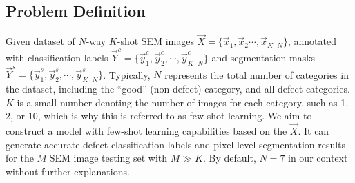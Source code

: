 
\subsection{Problem Definition}
\begin{myproblem} 

Given dataset of $N$-way $K$-shot SEM images $\vec{X} = \{\vec{x}_1, \vec{x}_2 \cdots, \vec{x}_{K \cdot N}\}$, annotated with classification labels $ \vec{Y}^c = \{\vec{y}_1^c, \vec{y}_2^c, \cdots, \vec{y}_{K \cdot N}^c\}$ and segmentation masks $\vec{Y} ^s = \{\vec{y}_1^s, \vec{y}_2^s, \cdots, \vec{y}_{K \cdot N}^s\}$. Typically, $N$ represents the total number of categories in the dataset, including the ``good'' (non-defect) category, and all defect categories. $K$ is a small number denoting the number of images for each category, such as 1, 2, or 10, which is why this is referred to as few-shot learning. 
We aim to construct a model with few-shot learning capabilities based on the $\vec{X}$. It can generate accurate defect classification labels and pixel-level segmentation results for the $M$ SEM image testing set with $M \gg K$. By default, $N=7$ in our context without further explanations. 

\end{myproblem}
